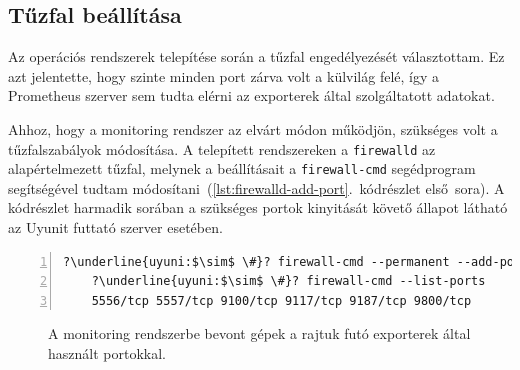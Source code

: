 \subsection{Tűzfal beállítása}
Az operációs rendszerek telepítése során a tűzfal engedélyezését választottam. Ez azt jelentette, hogy szinte minden port zárva volt a külvilág felé, így a Prometheus szerver sem tudta elérni az exporterek által szolgáltatott adatokat.

Ahhoz, hogy a monitoring rendszer az elvárt módon működjön, szükséges volt a tűzfalszabályok módosítása. A telepített rendszereken a \texttt{firewalld} az alapértelmezett tűzfal, melynek a beállításait a \texttt{firewall-cmd} segédprogram segítségével tudtam módosítani~(\ref{lst:firewalld-add-port}.~kódrészlet első~sora). A kódrészlet harmadik sorában a szükséges portok kinyitását követő állapot látható az Uyunit futtató szerver esetében.

\begin{lstlisting}[caption=Tűzfalszabályok módosítása.,label=lst:firewalld-add-port, numbers=left,escapechar=?]
	?\underline{uyuni:$\sim$ \#}? firewall-cmd --permanent --add-port=9117/tcp
	?\underline{uyuni:$\sim$ \#}? firewall-cmd --list-ports
	5556/tcp 5557/tcp 9100/tcp 9117/tcp 9187/tcp 9800/tcp
\end{lstlisting}


\begin{figure}[ht]
	\centering
	
	\caption{A monitoring rendszerbe bevont gépek a rajtuk futó exporterek által használt portokkal.}
	\label{fig:monitoring-setup}
\end{figure}